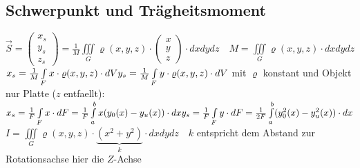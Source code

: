 \subsection{Schwerpunkt und Trägheitsmoment }
$\boxed{\vec{S}=\begin{pmatrix}
	x_s\\
	y_s\\
	z_s                                            
\end{pmatrix}=\frac{1}{M}\iiint\limits_G \varrho(x,y,z) \cdot
\begin{pmatrix}
	x\\
	y\\
	z                                            
\end{pmatrix}\cdot dxdydz \quad M=\iiint\limits_G \varrho(x,y,z) \cdot
dxdydz}$\\

$x_s=\frac{1}{M} \int\limits_F x \cdot \varrho(x,y,z)\cdot dV\\
y_s=\frac{1}{M} \int\limits_F y \cdot \varrho(x,y,z)\cdot dV\\$
mit $\varrho$ konstant und Objekt nur Platte ($z$ entfaellt):\\
$
x_s=\frac{1}{F} \int\limits_F x\cdot dF = \frac{1}{F} \int\limits_a^b
x(y_0(x)-y_u(x))\cdot dx\\
y_s=\frac{1}{F} \int\limits_F y\cdot dF = \frac{1}{2F} \int\limits_a^b
(y_0^2(x)-y_u^2(x))\cdot dx$\\

$\boxed{I=\iiint\limits_G \varrho(x,y,z)\cdot
\underbrace{(x^2+y^2)}_{k}\cdot
dxdydz}\quad k$ entspricht dem Abstand zur Rotationsachse hier die $Z$-Achse




